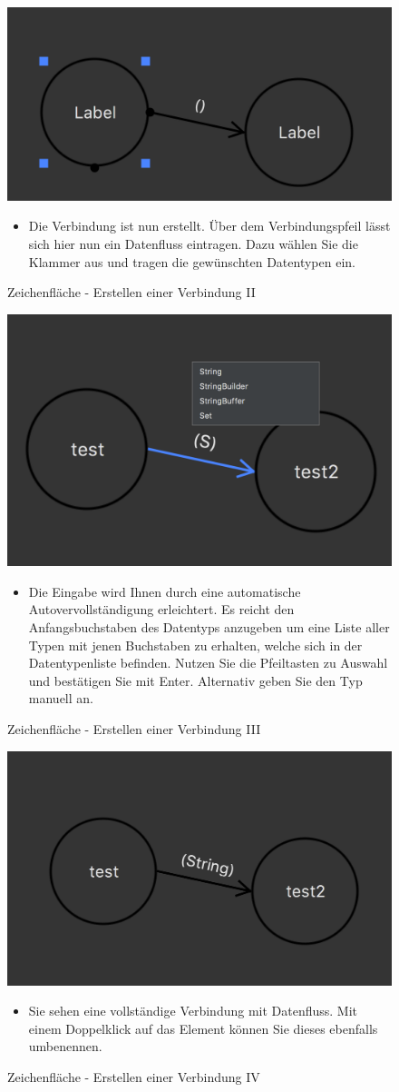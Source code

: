 \begin{figure}[h!]
	\centering
	\includegraphics[width=.4\textwidth]{Zeichenflaeche_Basics2.png}
	\caption{Zeichenfläche - Erstellen einer Verbindung II}	
\begin{itemize}	
\item Die Verbindung ist nun erstellt. Über dem Verbindungspfeil lässt sich hier nun ein Datenfluss eintragen. Dazu wählen Sie die Klammer aus und tragen die gewünschten Datentypen ein. 
\end{itemize}
\end{figure}

\begin{figure}[h!]
	\centering
	\includegraphics[width=.4\textwidth]{Zeichenflaeche_Basics3.png}
	\caption{Zeichenfläche - Erstellen einer Verbindung III}	
\begin{itemize}	
\item Die Eingabe wird Ihnen durch eine automatische Autovervollständigung erleichtert. Es reicht den Anfangsbuchstaben des Datentyps anzugeben um eine Liste aller Typen mit jenen Buchstaben zu erhalten, welche sich in der Datentypenliste befinden. Nutzen Sie die Pfeiltasten zu Auswahl und bestätigen Sie mit Enter. Alternativ geben Sie den Typ manuell an.
\end{itemize}
\end{figure}

\begin{figure}[h!]
	\centering
	\includegraphics[width=.4\textwidth]{Zeichenflaeche_Basics4.png}
	\caption{Zeichenfläche - Erstellen einer Verbindung IV}	
\begin{itemize}	
\item Sie sehen eine vollständige Verbindung mit Datenfluss. Mit einem Doppelklick auf das Element können Sie dieses ebenfalls umbenennen.
\end{itemize}
\end{figure}



